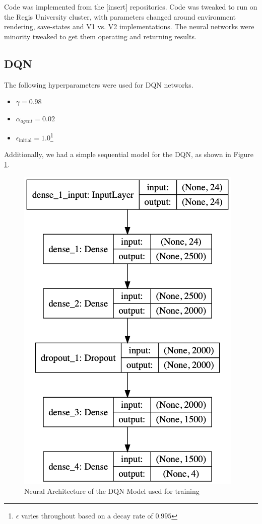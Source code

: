 \documentclass[doc, onecolumn, 12pt]{apa6}
\begin{document}
Code was implemented from the [insert] repositories. Code was tweaked to run on the Regis University cluster, with parameters changed around environment rendering, save-states and V1 vs. V2 implementations. The neural networks were minority tweaked to get them operating and returning results. 

\subsection{DQN}
The following hyperparameters were used for DQN networks. \begin{itemize}
\item $\gamma = 0.98$
\item $\alpha_{agent} = 0.02$
\item $\epsilon_{\text{initial}} = 1.0$\footnote{$\epsilon$ varies throughout based on a decay rate of $0.995$} 
\end{itemize}

Additionally, we had a simple sequential model for the DQN, as shown in Figure \ref{DQN_Architecture}.

\begin{figure}
\label{DQN_Architecture}
\includegraphics[width=\textwidth]{results/dqn/DQN_Model.png}
\caption{Neural Architecture of the DQN Model used for training}
\end{figure}
\end{document}
